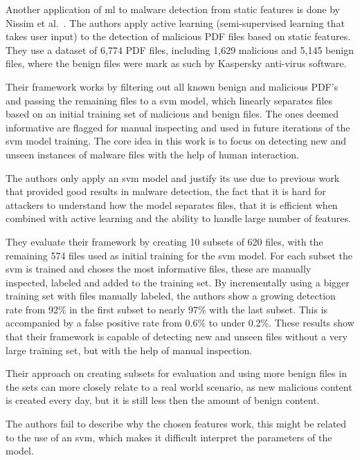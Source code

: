 \medskip

Another application of \gls{ml} to malware detection from static features is done by Nissim et al.~\cite{nissim:al_pdf}.
The authors apply active learning (semi-supervised learning that takes user input) to the detection of malicious PDF files based on static features.
They use a dataset of 6,774 PDF files, including 1,629 malicious and 5,145 benign files, where the benign files were mark as such by Kaspersky anti-virus software.

Their framework works by filtering out all known benign and malicious PDF's and passing the remaining files to a \gls{svm} model, which linearly separates files based on an initial training set of malicious and benign files.
The ones deemed informative are flagged for manual inspecting and used in future iterations of the \gls{svm} model training.
The core idea in this work is to focus on detecting new and unseen instances of malware files with the help of human interaction.

The authors only apply an \gls{svm} model and justify its use due to previous work that provided good results in malware detection, the fact that it is hard for attackers to understand how the model separates files, that it is efficient when combined with active learning and the ability to handle large number of features.

They evaluate their framework by creating 10 subsets of 620 files, with the remaining 574 files used as initial training for the \gls{svm} model.
For each subset the \gls{svm} is trained and choses the most informative files, these are manually inspected, labeled and added to the training set.
By incrementally using a bigger training set with files manually labeled, the authors show a growing detection rate from 92\% in the first subset to nearly 97\% with the last subset.
This is accompanied by a false positive rate from 0.6\% to under 0.2\%.
These results show that their framework is capable of detecting new and unseen files without a very large training set, but with the help of manual inspection.

Their approach on creating subsets for evaluation and using more benign files in the sets can more closely relate to a real world scenario, as new malicious content is created every day, but it is still less then the amount of benign content.

The authors fail to describe why the chosen features work, this might be related to the use of an \gls{svm}, which makes it difficult interpret the parameters of the model.

